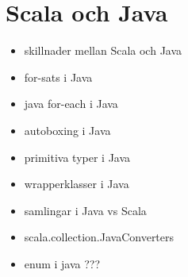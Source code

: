 \chapter{Scala och Java}\label{chapter:W11}
\begin{multicols}{2}\begin{itemize}[nosep,label={$\square$}]
\item skillnader mellan Scala och Java
\item for-sats i Java
\item java for-each i Java
\item autoboxing i Java
\item primitiva typer i Java
\item wrapperklasser i Java
\item samlingar i Java vs Scala
\item scala.collection.JavaConverters
\item enum i java ???\end{itemize}\end{multicols}
